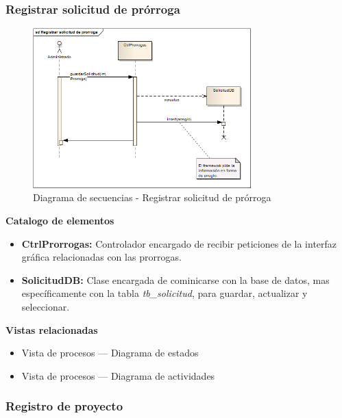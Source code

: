 \documentclass[12pt,oneside,letterpaper]{report}
\begin{document}
\subsubsection{Registrar solicitud de prórroga}

\begin{figure}[h!]
  \centering
    \includegraphics[width=0.75\textwidth]{./img/img15.png}
  \caption{Diagrama de secuencias - Registrar solicitud de prórroga}
\end{figure}

\textbf{Catalogo de elementos}

\begin{itemize}
 \item \textbf{CtrlProrrogas:} Controlador encargado de recibir peticiones de la interfaz gráfica relacionadas con las prorrogas.
 \item \textbf{SolicitudDB:} Clase encargada de cominicarse con la base de datos, mas específicamente con la tabla \textit{tb\_solicitud}, para guardar, actualizar y seleccionar.
\end{itemize}


\textbf{Vistas relacionadas}
\begin{itemize}
 \item Vista de procesos --- Diagrama de estados
 \item Vista de procesos --- Diagrama de actividades
\end{itemize}

\subsubsection{Registro de proyecto}
\end{document}
